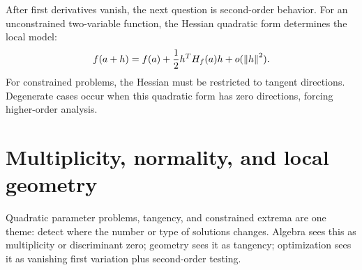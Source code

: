 After first derivatives vanish, the next question is second-order behavior.  For an unconstrained two-variable function, the Hessian quadratic form determines the local model:
\[
  f(a+h)=f(a)+\frac12 h^T H_f(a)h+o(\left\lVert h \right\rVert^2).
\]
For constrained problems, the Hessian must be restricted to tangent directions.  Degenerate cases occur when this quadratic form has zero directions, forcing higher-order analysis.

\section{Multiplicity, normality, and local geometry}

Quadratic parameter problems, tangency, and constrained extrema are one theme: detect where the number or type of solutions changes.  Algebra sees this as multiplicity or discriminant zero; geometry sees it as tangency; optimization sees it as vanishing first variation plus second-order testing.
